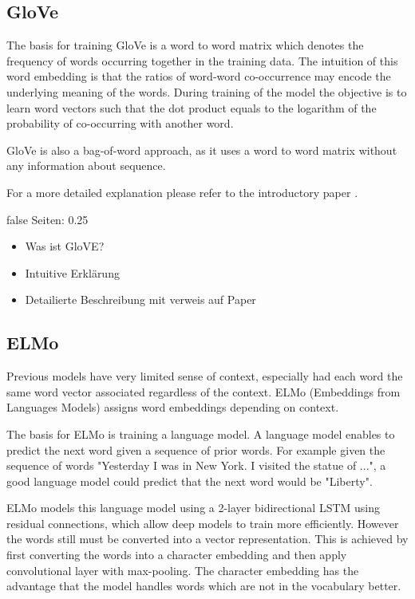 \documentclass[draft,final,oneside]{vutinfth} %
\begin{document}
\fi

\subsection{GloVe \cite{glovepage}}
The basis for training GloVe is a word to word matrix which denotes the frequency of words occurring together in the training data. The intuition of this word embedding is that the ratios of word-word co-occurrence may encode the underlying meaning of the words. During training of the model the objective is to learn word vectors such that the dot product equals to the logarithm of the probability of co-occurring with another word.

GloVe is also a bag-of-word approach, as it uses a word to word matrix without any information about sequence.

For a more detailed explanation please refer to the introductory paper \cite{glovepage}.

\if false
Seiten: 0.25

\begin{itemize}
\item Was ist GloVE?
\item Intuitive Erklärung
\item Detailierte Beschreibung mit verweis auf Paper
\end{itemize}

\fi

\subsection{ELMo \cite{elmo}}
Previous models have very limited sense of context, especially had each word the same word vector associated regardless of the context. ELMo (Embeddings from Languages Models) assigns word embeddings depending on context.

The basis for ELMo is training a language model. A language model enables to predict the next word given a sequence of prior words. For example given the sequence of words "Yesterday I was in New York. I visited the statue of ...", a good language model could predict that the next word would be "Liberty".

ELMo models this language model using a 2-layer bidirectional LSTM using residual connections, which allow deep models to train more efficiently. However the words still must be converted into a vector representation. This is achieved by first converting the words into a character embedding and then apply convolutional layer with max-pooling. The character embedding has the advantage that the model handles words which are not in the vocabulary better.
\end{document}

